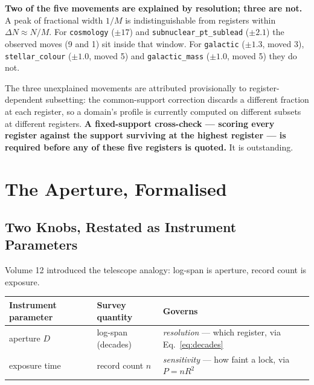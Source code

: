 \documentclass[11pt, letterpaper, openany]{book}
\begin{document}
\begin{warningbox}
\textbf{Two of the five movements are explained by resolution; three are not.} A peak of fractional
width $1/M$ is indistinguishable from registers within $\Delta N \approx N/M$. For
\texttt{cosmology} ($\pm 17$) and \texttt{subnuclear\_pt\_sublead} ($\pm 2.1$) the observed moves
(9 and 1) sit inside that window. For \texttt{galactic} ($\pm 1.3$, moved 3),
\texttt{stellar\_colour} ($\pm 1.0$, moved 5) and \texttt{galactic\_mass} ($\pm 1.0$, moved 5) they
do not.

\medskip
The three unexplained movements are attributed provisionally to register-dependent subsetting: the
common-support correction discards a different fraction at each register, so a domain's profile is
currently computed on different subsets at different registers. \textbf{A fixed-support cross-check
--- scoring every register against the support surviving at the highest register --- is required
before any of these five registers is quoted.} It is outstanding.
\end{warningbox}

\chapter{The Aperture, Formalised}

\section{Two Knobs, Restated as Instrument Parameters}

Volume 12 introduced the telescope analogy: log-span is aperture, record count is exposure.

\begin{table}[H]
\centering
\small
\begin{tabular}{@{}lll@{}}
\toprule
\textbf{Instrument parameter} & \textbf{Survey quantity} & \textbf{Governs} \\
\midrule
aperture $D$ & log-span (decades) & \emph{resolution} --- which register, via Eq.~\ref{eq:decades} \\
exposure time & record count $n$ & \emph{sensitivity} --- how faint a lock, via $P = nR^2$ \\
\bottomrule
\end{tabular}
\end{table}
\end{document}
